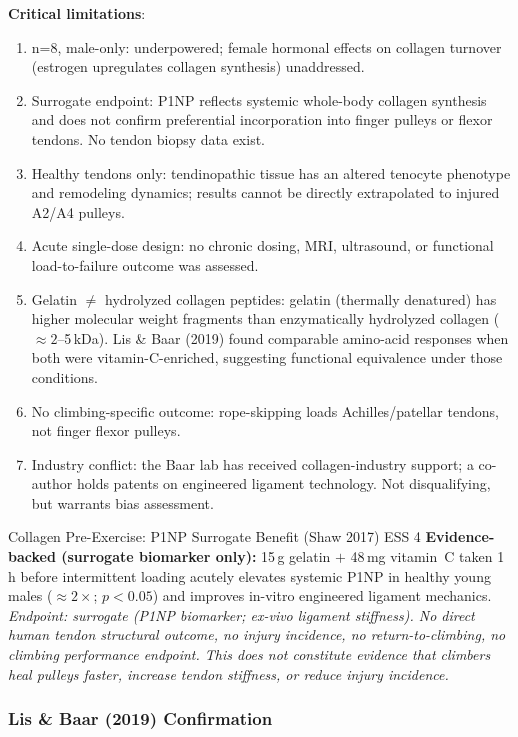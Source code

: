 \textbf{Critical limitations}:
\begin{enumerate}[noitemsep]
  \item n=8, male-only: underpowered; female hormonal effects on collagen turnover (estrogen upregulates collagen synthesis) unaddressed.
  \item Surrogate endpoint: P1NP reflects systemic whole-body collagen synthesis and does not confirm preferential incorporation into finger pulleys or flexor tendons. No tendon biopsy data exist.
  \item Healthy tendons only: tendinopathic tissue has an altered tenocyte phenotype and remodeling dynamics; results cannot be directly extrapolated to injured A2/A4 pulleys.
  \item Acute single-dose design: no chronic dosing, MRI, ultrasound, or functional load-to-failure outcome was assessed.
  \item Gelatin $\ne$ hydrolyzed collagen peptides: gelatin (thermally denatured) has higher molecular weight fragments than enzymatically hydrolyzed collagen (${\approx}2$--5\,kDa). Lis \& Baar (2019) found comparable amino-acid responses when both were vitamin-C-enriched, suggesting functional equivalence under those conditions.
  \item No climbing-specific outcome: rope-skipping loads Achilles/patellar tendons, not finger flexor pulleys.
  \item Industry conflict: the Baar lab has received collagen-industry support; a co-author holds patents on engineered ligament technology. Not disqualifying, but warrants bias assessment.
\end{enumerate}

\begin{evidencebox}{Collagen Pre-Exercise: P1NP Surrogate Benefit (Shaw 2017) \cdot \evidencebacked \cdot ESS 4}
\textbf{Evidence-backed (surrogate biomarker only):} 15\,g gelatin $+$ 48\,mg vitamin~C taken 1\,h before intermittent loading acutely elevates systemic P1NP in healthy young males (${\approx}2{\times}$; $p{<}0.05$) and improves in-vitro engineered ligament mechanics. \textit{Endpoint: surrogate (P1NP biomarker; ex-vivo ligament stiffness). No direct human tendon structural outcome, no injury incidence, no return-to-climbing, no climbing performance endpoint. This does not constitute evidence that climbers heal pulleys faster, increase tendon stiffness, or reduce injury incidence.}
\end{evidencebox}

\subsubsection{Lis \& Baar (2019) Confirmation}

